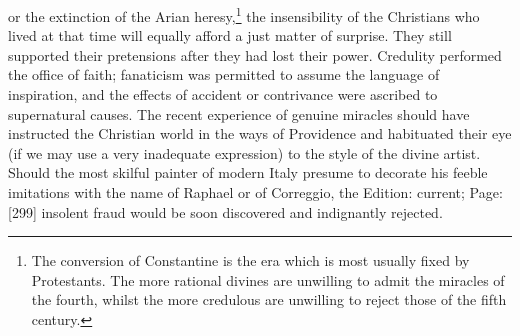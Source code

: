 or the extinction of the Arian heresy,\footnote{The conversion of Constantine is the era which is most usually fixed by Protestants. The more rational divines are unwilling to admit the miracles of the fourth, whilst the more credulous are unwilling to reject those of the fifth century.} the insensibility of the Christians who lived at that time will equally afford a just matter of surprise. They still supported their pretensions after they had lost their power. Credulity performed the office of faith; fanaticism was permitted to assume the language of inspiration, and the effects of accident or contrivance were ascribed to supernatural causes. The recent experience of genuine miracles should have instructed the Christian world in the ways of Providence and habituated their eye (if we may use a very inadequate expression) to the style of the divine artist. Should the most skilful painter of modern Italy presume to decorate his feeble imitations with the name of Raphael or of Correggio, the Edition: current; Page: [299] insolent fraud would be soon discovered and indignantly rejected.

